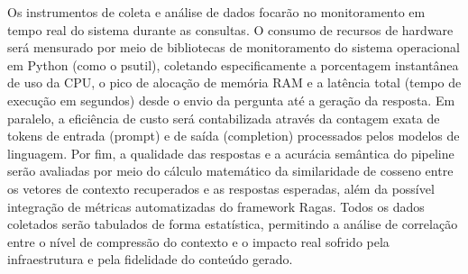 Os instrumentos de coleta e análise de dados focarão no monitoramento em tempo real do sistema durante as consultas. O consumo de recursos de hardware será mensurado por meio de bibliotecas de monitoramento do sistema operacional em Python (como o psutil), coletando especificamente a porcentagem instantânea de uso da CPU, o pico de alocação de memória RAM e a latência total (tempo de execução em segundos) desde o envio da pergunta até a geração da resposta. Em paralelo, a eficiência de custo será contabilizada através da contagem exata de tokens de entrada (prompt) e de saída (completion) processados pelos modelos de linguagem. Por fim, a qualidade das respostas e a acurácia semântica do pipeline serão avaliadas por meio do cálculo matemático da similaridade de cosseno entre os vetores de contexto recuperados e as respostas esperadas, além da possível integração de métricas automatizadas do framework Ragas. Todos os dados coletados serão tabulados de forma estatística, permitindo a análise de correlação entre o nível de compressão do contexto e o impacto real sofrido pela infraestrutura e pela fidelidade do conteúdo gerado.